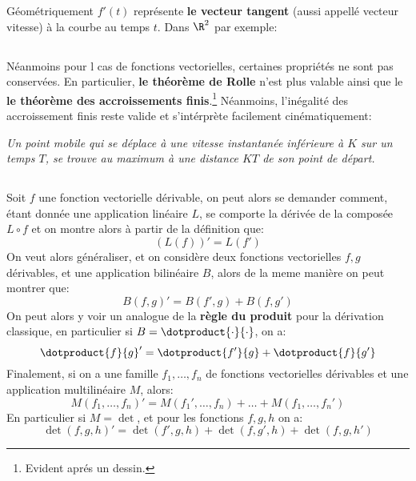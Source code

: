 Géométriquement \(f'(t)\) représente \textbf{le vecteur tangent} (aussi appellé vecteur vitesse) à la courbe au temps \(t\). Dans \(\R^2\) par exemple:
\begin{center}
\end{center}
\pagebreak
\subsection*{}
Néanmoins pour l cas de fonctions vectorielles, certaines propriétés ne sont pas conservées. En particulier, \textbf{le théorème de Rolle} n'est plus valable ainsi que le \textbf{le théorème des accroissements finis}.\footnote[1]{Evident aprés un dessin.}
Néanmoins, l'inégalité des accroissement finis reste valide et s'intérprète facilement cinématiquement:
\begin{center}
   \textit{Un point mobile qui se déplace à une vitesse instantanée inférieure à \(K\) sur un temps \(T\), se trouve au maximum à une distance \(KT\) de son point de départ.}
\end{center}
\subsection*{}
Soit \(f\) une fonction vectorielle dérivable, on peut alors se demander comment, étant donnée une application linéaire \(L\), se comporte la dérivée de la composée \(L \circ f\) et on montre alors à partir de la définition que:
\[
   (L(f))' = L(f')
\] 
On veut alors généraliser, et on considère deux fonctions vectorielles \(f, g\) dérivables, et une application bilinéaire \(B\), alors de la meme manière on peut montrer que:
\[
   B(f, g)' = B(f', g) + B(f, g')
\]
On peut alors y voir un analogue de la \textbf{règle du produit} pour la dérivation classique, en particulier si \(B = \dotproduct{\cdot}{\cdot}\), on a:
\[
   \dotproduct{f}{g}' = \dotproduct{f'}{g} + \dotproduct{f}{g'}
\]
Finalement, si on a une famille \(f_1, \ldots, f_n\) de fonctions vectorielles dérivables et une application multilinéaire \(M\), alors:
\[
   M(f_1, \ldots, f_n)' = M(f_1', \ldots, f_n) + \ldots + M(f_1, \ldots, f_n')
\]
En particulier si \(M = \det\), et pour les fonctions \(f, g, h\) on a:
\[
   \det(f, g, h)' = \det(f', g, h) + \det(f, g', h) + \det(f, g, h')  
\]
